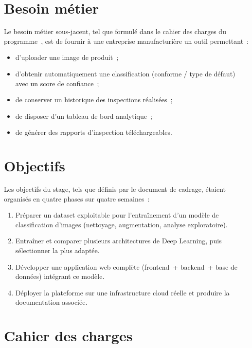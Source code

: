 \section{Besoin m\'etier}

Le besoin m\'etier sous-jacent, tel que formul\'e dans le cahier des charges du programme~\cite{techskillhub}, est de fournir \`a une entreprise manufacturi\`ere un outil permettant~:
\begin{itemize}
  \item d'uploader une image de produit~;
  \item d'obtenir automatiquement une classification (conforme / type de d\'efaut) avec un score de confiance~;
  \item de conserver un historique des inspections r\'ealis\'ees~;
  \item de disposer d'un tableau de bord analytique~;
  \item de g\'en\'erer des rapports d'inspection t\'el\'echargeables.
\end{itemize}

\section{Objectifs}

Les objectifs du stage, tels que d\'efinis par le document de cadrage, \'etaient organis\'es en quatre phases sur quatre semaines~:
\begin{enumerate}
  \item Pr\'eparer un dataset exploitable pour l'entra\^inement d'un mod\`ele de classification d'images (nettoyage, augmentation, analyse exploratoire).
  \item Entra\^iner et comparer plusieurs architectures de Deep Learning, puis s\'electionner la plus adapt\'ee.
  \item D\'evelopper une application web compl\`ete (frontend~+ backend~+ base de donn\'ees) int\'egrant ce mod\`ele.
  \item D\'eployer la plateforme sur une infrastructure cloud r\'eelle et produire la documentation associ\'ee.
\end{enumerate}

\section{Cahier des charges}

